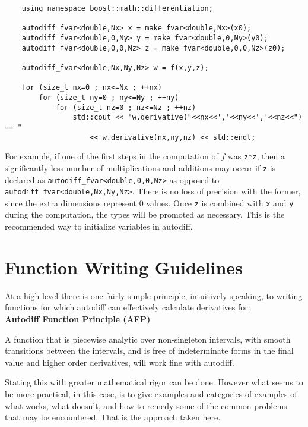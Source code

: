 \documentclass{article}
\begin{document}
\begin{verbatim}
    using namespace boost::math::differentiation;

    autodiff_fvar<double,Nx> x = make_fvar<double,Nx>(x0);
    autodiff_fvar<double,0,Ny> y = make_fvar<double,0,Ny>(y0);
    autodiff_fvar<double,0,0,Nz> z = make_fvar<double,0,0,Nz>(z0);

    autodiff_fvar<double,Nx,Ny,Nz> w = f(x,y,z);

    for (size_t nx=0 ; nx<=Nx ; ++nx)
        for (size_t ny=0 ; ny<=Ny ; ++ny)
            for (size_t nz=0 ; nz<=Nz ; ++nz)
                std::cout << "w.derivative("<<nx<<','<<ny<<','<<nz<<") == "
                    << w.derivative(nx,ny,nz) << std::endl;
\end{verbatim}
For example, if one of the first steps in the computation of $f$ was {\tt z*z}, then a significantly less number of
multiplications and additions may occur if {\tt z} is declared as {\tt autodiff\_fvar<double,0,0,Nz>} as opposed to \\
{\tt autodiff\_fvar<double,Nx,Ny,Nz>}. There is no loss of precision with the former, since the extra dimensions
represent 0 values. Once {\tt z} is combined with {\tt x} and {\tt y} during the computation, the types will be
promoted as necessary.  This is the recommended way to initialize variables in autodiff.

\section{Function Writing Guidelines}

At a high level there is one fairly simple principle, intuitively speaking, to writing functions for which autodiff
can effectively calculate derivatives for: \\

{\bf Autodiff Function Principle (AFP)}
\begin{displayquote}
A function that is piecewise analytic over non-singleton intervals, with smooth transitions between the intervals,
and is free of indeterminate forms in the final value and higher order derivatives, will work fine with autodiff.
\end{displayquote}
Stating this with greater mathematical rigor can be done. However what seems to be more practical, in this
case, is to give examples and categories of examples of what works, what doesn't, and how to remedy some of the
common problems that may be encountered. That is the approach taken here.
\end{document}
